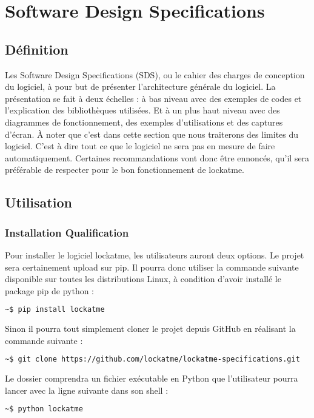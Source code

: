 \chapter{Software Design Specifications}
\newpage
\section{Définition}
Les Software Design Specifications (SDS), ou le cahier des charges de conception
du logiciel, à pour but de présenter l'architecture générale du logiciel.
La présentation se fait à deux échelles : à bas niveau avec des exemples de codes et
l'explication des bibliothèques utilisées. Et à un plus haut niveau avec des diagrammes
de fonctionnement, des exemples d'utilisations et des captures d'écran. À noter
que c'est dans cette section que nous traiterons des limites du logiciel. C'est
à dire tout ce que le logiciel ne sera pas en mesure de faire automatiquement.
Certaines recommandations vont donc être ennoncés, qu'il sera préférable de
respecter pour le bon fonctionnement de lockatme.
\section{Utilisation}
  \subsection{Installation Qualification}
Pour installer le logiciel lockatme, les utilisateurs auront deux options. Le
projet sera certainement upload sur pip. Il pourra donc utiliser la commande
suivante disponible sur toutes les distributions Linux, à condition d'avoir
installé le package pip de python :
\begin{lstlisting}[language=bash]
  ~$ pip install lockatme
\end{lstlisting}
Sinon il pourra tout simplement cloner le projet depuis GitHub en réalisant la
commande suivante :
\begin{lstlisting}[language=bash]
  ~$ git clone https://github.com/lockatme/lockatme-specifications.git
\end{lstlisting}
Le dossier comprendra un fichier exécutable en Python que l'utilisateur pourra
lancer avec la ligne suivante dans son shell :
\begin{lstlisting}[language=bash]
  ~$ python lockatme
\end{lstlisting}

